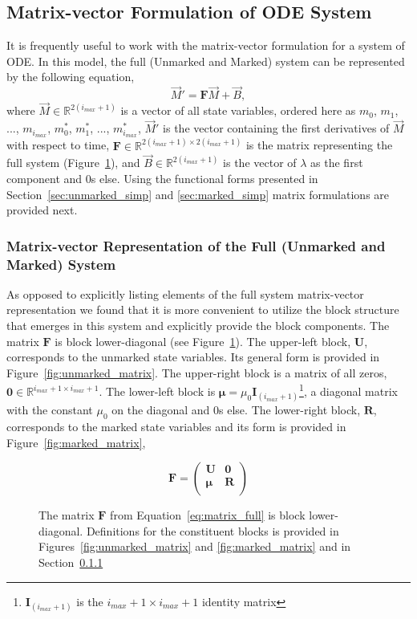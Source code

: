 \documentclass[review]{elsarticle}
\let\bs\boldsymbol
\begin{document}
\subsection{Matrix-vector Formulation of ODE System}
It is frequently useful to work with the matrix-vector formulation for a system of ODE.
In this model, the full (Unmarked and Marked) system can be represented by the following equation, \begin{equation}\label{eq:matrix_full}\vec{M}'=\boldsymbol{F}\vec{M}+\vec{B},\end{equation} where $\vec{M}\in\mathbb{R}^{2(i_{max}+1)}$ is a vector of all state variables, ordered here as $m_0$, $m_1$, ..., $m_{i_{max}}$, $m^*_0$, $m^*_1$, ..., $m^*_{i_{max}}$, $\vec{M}'$ is the vector containing the first derivatives of $\vec{M}$ with respect to time, $\bs{F}\in\mathbb{R}^{2(i_{max}+1)\times 2(i_{max}+1)}$ is the matrix representing the full system (Figure~\ref{fig:full_matrix}), and $\vec{B}\in\mathbb{R}^{2(i_{max}+1)}$ is the vector of $\lambda$ as the first component and 0s else.
Using the functional forms presented in Section~\ref{sec:unmarked_simp} and \ref{sec:marked_simp} matrix formulations are provided next.

\subsubsection{Matrix-vector Representation of the Full (Unmarked and Marked) System}\label{sec:full_matrix}
As opposed to explicitly listing elements of the full system matrix-vector representation we found that it is more convenient to utilize the block structure that emerges in this system and explicitly provide the block components.
The matrix $\bs{F}$ is block lower-diagonal (see Figure~\ref{fig:full_matrix}).
The upper-left block, $\bs{U}$, corresponds to the unmarked state variables.
Its general form is provided in Figure~\ref{fig:unmarked_matrix}.
The upper-right block is a matrix of all zeros, $\bs{0}\in\mathbb{R}^{i_{max}+1\times i_{max}+1}$.
The lower-left block is $\bs{\mu}=\mu_0\bs{I}_{(i_{max}+1)}$\footnote{$\bs{I}_{(i_{max}+1)}$ is the $i_{max}+1\times i_{max}+1$ identity matrix}, a diagonal matrix with the constant $\mu_0$ on the diagonal and 0s else.
The lower-right block, $\bs{R}$, corresponds to the marked state variables and its form is provided in Figure~\ref{fig:marked_matrix},

\begin{figure}[ht]
\caption{The matrix $\bs{F}$ from Equation~\ref{eq:matrix_full} is block lower-diagonal.
Definitions for the constituent blocks is provided in Figures~\ref{fig:unmarked_matrix} and \ref{fig:marked_matrix} and in Section~\ref{sec:full_matrix}}
\label{fig:full_matrix}
\[
\bs{F}=\left(\begin{array}{cc}
\bs{U} & \bs{0} \\
\bs{\mu} & \bs{R} \\
\end{array} \right)
\]
\end{figure}
\end{document}
